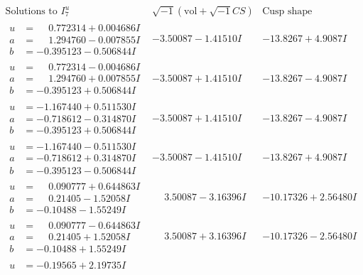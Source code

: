 \documentclass[1p]{elsarticle_modified}
\theoremstyle{definition}
\newcommand{\I}{\sqrt{-1}}
\begin{document}
$$\begin{array}{c|c|c}  
\text{Solutions to }I^u_{7}& \I (\text{vol} + \sqrt{-1}CS) & \text{Cusp shape}\\
 \hline 
\begin{aligned}
u &= \phantom{-}0.772314 + 0.004686 I \\
a &= \phantom{-}1.294760 - 0.007855 I \\
b &= -0.395123 - 0.506844 I\end{aligned}
 & -3.50087 - 1.41510 I & -13.8267 + 4.9087 I \\ \hline\begin{aligned}
u &= \phantom{-}0.772314 - 0.004686 I \\
a &= \phantom{-}1.294760 + 0.007855 I \\
b &= -0.395123 + 0.506844 I\end{aligned}
 & -3.50087 + 1.41510 I & -13.8267 - 4.9087 I \\ \hline\begin{aligned}
u &= -1.167440 + 0.511530 I \\
a &= -0.718612 - 0.314870 I \\
b &= -0.395123 + 0.506844 I\end{aligned}
 & -3.50087 + 1.41510 I & -13.8267 - 4.9087 I \\ \hline\begin{aligned}
u &= -1.167440 - 0.511530 I \\
a &= -0.718612 + 0.314870 I \\
b &= -0.395123 - 0.506844 I\end{aligned}
 & -3.50087 - 1.41510 I & -13.8267 + 4.9087 I \\ \hline\begin{aligned}
u &= \phantom{-}0.090777 + 0.644863 I \\
a &= \phantom{-}0.21405 - 1.52058 I \\
b &= -0.10488 - 1.55249 I\end{aligned}
 & \phantom{-}3.50087 - 3.16396 I & -10.17326 + 2.56480 I \\ \hline\begin{aligned}
u &= \phantom{-}0.090777 - 0.644863 I \\
a &= \phantom{-}0.21405 + 1.52058 I \\
b &= -0.10488 + 1.55249 I\end{aligned}
 & \phantom{-}3.50087 + 3.16396 I & -10.17326 - 2.56480 I \\ \hline\begin{aligned}
u &= -0.19565 + 2.19735 I \\

\end{aligned}
\end{array}$$
\end{document}
